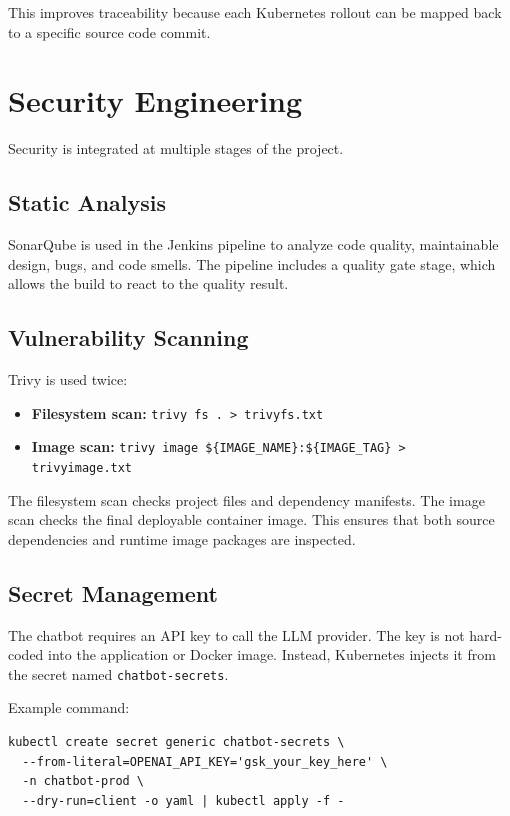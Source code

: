 \documentclass[12pt,a4paper]{article}
\begin{document}
This improves traceability because each Kubernetes rollout can be mapped back to
a specific source code commit.

\section{Security Engineering}

Security is integrated at multiple stages of the project.

\subsection{Static Analysis}

SonarQube is used in the Jenkins pipeline to analyze code quality, maintainable
design, bugs, and code smells. The pipeline includes a quality gate stage, which
allows the build to react to the quality result.

\subsection{Vulnerability Scanning}

Trivy is used twice:

\begin{itemize}[leftmargin=*]
    \item \textbf{Filesystem scan:} \texttt{trivy fs . > trivyfs.txt}
    \item \textbf{Image scan:} \texttt{trivy image \$\{IMAGE\_NAME\}:\$\{IMAGE\_TAG\} > trivyimage.txt}
\end{itemize}

The filesystem scan checks project files and dependency manifests. The image
scan checks the final deployable container image. This ensures that both source
dependencies and runtime image packages are inspected.

\subsection{Secret Management}

The chatbot requires an API key to call the LLM provider. The key is not
hard-coded into the application or Docker image. Instead, Kubernetes injects it
from the secret named \texttt{chatbot-secrets}.

Example command:

\begin{lstlisting}[style=projectcode]
kubectl create secret generic chatbot-secrets \
  --from-literal=OPENAI_API_KEY='gsk_your_key_here' \
  -n chatbot-prod \
  --dry-run=client -o yaml | kubectl apply -f -
\end{lstlisting}
\end{document}
